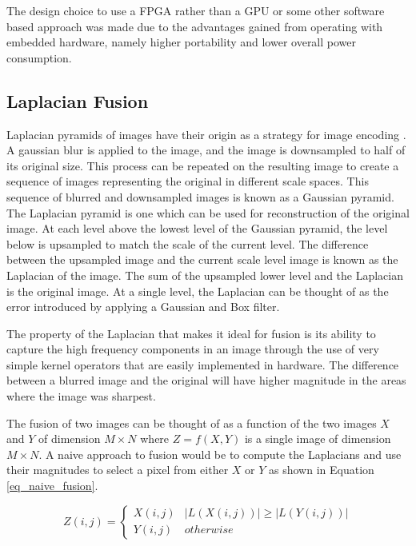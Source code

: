 \documentclass{article}
\begin{document}
The design choice to use a FPGA rather than a GPU or some other software based approach was made due to the advantages gained from operating with embedded hardware, namely higher portability and lower overall power consumption.

\subsection{Laplacian Fusion}

Laplacian pyramids of images have their origin as a strategy for image encoding \cite{burt_laplacian_1983}. A gaussian blur is applied to the image, and the image is downsampled to half of its original size. This process can be repeated on the resulting image to create a sequence of images representing the original in different scale spaces. This sequence of blurred and downsampled images is known as a Gaussian pyramid. The Laplacian pyramid is one which can be used for reconstruction of the original image. At each level above the lowest level of the Gaussian pyramid, the level below is upsampled to match the scale of the current level. The difference between the upsampled image and the current scale level image is known as the Laplacian of the image. The sum of the upsampled lower level and the Laplacian is the original image. At a single level, the Laplacian can be thought of as the error introduced by applying a Gaussian and Box filter.

The property of the Laplacian that makes it ideal for fusion is its ability to capture the high frequency components in an image through the use of very simple kernel operators that are easily implemented in hardware. The difference between a blurred image and the original will have higher magnitude in the areas where the image was sharpest.

The fusion of two images can be thought of as a function of the two images $X$ and $Y$ of dimension $M \times N$ where $Z = f(X, Y)$ is a single image of dimension $M \times N$. A naive approach to fusion would be to compute the Laplacians and use their magnitudes to select a pixel from either $X$ or $Y$ as shown in Equation \ref{eq_naive_fusion}.

\begin{equation}
Z(i,j)=
\begin{cases}
X(i,j) & |L(X(i,j))| \ge |L(Y(i,j))| \\
Y(i,j) & otherwise
\end{cases}
\label{eq_naive_fusion}
\end{equation}
\end{document}
